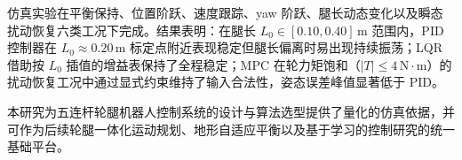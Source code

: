 \documentclass{smbuthesis}
\begin{document}
\begin{abstractZH}
仿真实验在平衡保持、位置阶跃、速度跟踪、yaw 阶跃、腿长动态变化以及瞬态扰动恢复六类工况下完成。结果表明：在腿长 $L_0 \in [0.10, 0.40]\,\mathrm{m}$ 范围内，PID 控制器在 $L_0 \approx 0.20\,\mathrm{m}$ 标定点附近表现稳定但腿长偏离时易出现持续振荡；LQR 借助按 $L_0$ 插值的增益表保持了全程稳定；MPC 在轮力矩饱和（$|T| \le 4\,\mathrm{N\cdot m}$）的扰动恢复工况中通过显式约束维持了输入合法性，姿态误差峰值显著低于 PID。

本研究为五连杆轮腿机器人控制系统的设计与算法选型提供了量化的仿真依据，并可作为后续轮腿一体化运动规划、地形自适应平衡以及基于学习的控制研究的统一基础平台。

\end{abstractZH}

\begin{abstractRU}
\setlength{\parindent}{2em}


\end{abstractRU}
\end{document}
